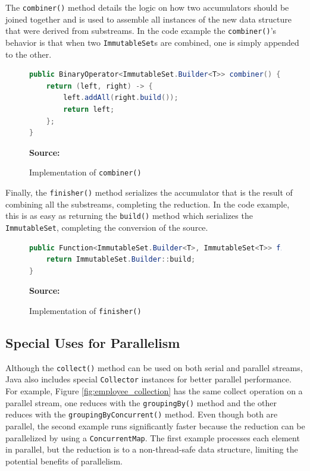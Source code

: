 \documentclass[oneside, 12pt]{article}
\newcommand{\source}[1]{\textbf{Source:} {#1} }
\begin{document}
The \verb|combiner()| method details the logic on how two accumulators should be joined together and is used to assemble all instances of the new data structure that were derived from substreams. In the code example the \verb|combiner()|'s behavior is that when two \verb|ImmutableSet|s are combined, one is simply appended to the other.

\begin{figure}[H]
\centering
\begin{lstlisting}[language=Java]
public BinaryOperator<ImmutableSet.Builder<T>> combiner() {
    return (left, right) -> {
        left.addAll(right.build());
        return left;
    };
}
\end{lstlisting}
\caption{Implementation of {\tt combiner()}}
\source{\autocite{custom_collector}}
\label{fig:combiner}
\end{figure}

Finally, the \verb|finisher()| method serializes the accumulator that is the result of combining all the substreams, completing the reduction. In the code example, this is as easy as returning the \verb|build()| method which serializes the \verb|ImmutableSet|, completing the conversion of the source.

\begin{figure}[H]
\centering
\begin{lstlisting}[language=Java]
public Function<ImmutableSet.Builder<T>, ImmutableSet<T>> finisher() {
    return ImmutableSet.Builder::build;
}
\end{lstlisting}
\caption{Implementation of {\tt finisher()}}
\source{\autocite{custom_collector}}
\label{fig:finisher}
\end{figure}

\subsection{Special Uses for Parallelism}
Although the \verb|collect()| method can be used on both serial and parallel streams, Java also includes special \verb|Collector| instances for better parallel performance. For example, Figure \ref{fig:employee_collection} has the same collect operation on a parallel stream, one reduces with the \verb|groupingBy()| method and the other reduces with the \verb|groupingByConcurrent()| method. Even though both are parallel, the second example runs significantly faster because the reduction can be parallelized by using a \verb|ConcurrentMap|. The first example processes each element in parallel, but the reduction is to a non-thread-safe data structure, limiting the potential benefits of parallelism.
\end{document}
